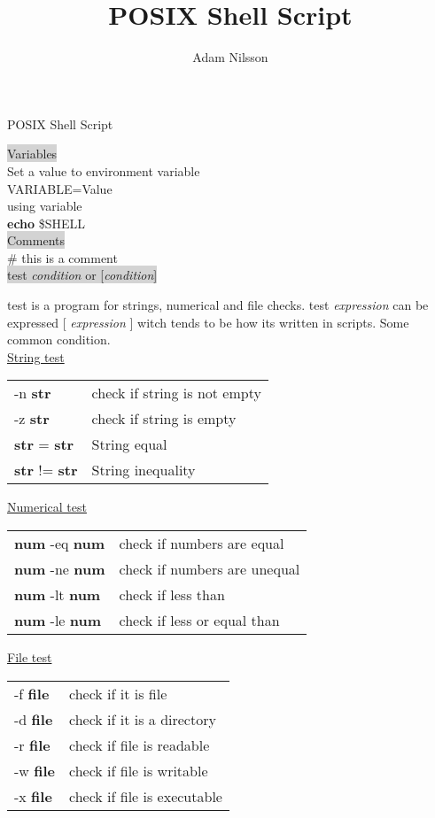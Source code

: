 \documentclass[1pt]{proc}
\title{POSIX Shell Script}
\author{Adam Nilsson}
\begin{document}
\begin{landscape}
\huge{POSIX Shell Script}
\normalsize \\
\begin{multicols}{3}
\colorbox{lightgray}{Variables}\\
Set a value to environment variable\\
VARIABLE=Value \\
using variable \\
\textbf{echo} \$SHELL \\
\colorbox{lightgray}{Comments}\\
\# this is a comment\\
\colorbox{lightgray}{test \textit{condition} or [\textit{condition}]}

test is a program for strings, numerical and file checks. test \textit{expression} can be expressed [ \textit{expression} ] witch tends to be how its written in scripts.
Some common condition.\\
\underline{String test} \\
\begin{tabular}{ l l }
	-n \textbf{str} & check if string is not empty \\
	-z \textbf{str} & check if string is empty \\
	\textbf{str} = \textbf{str} & String equal \\
	\textbf{str} != \textbf{str} & String inequality
\end{tabular}
\underline{Numerical test} \\
\begin{tabular}{ l l }
	\textbf{num} -eq \textbf{num} & check if numbers are equal \\
	\textbf{num} -ne \textbf{num} & check if numbers are unequal \\
	\textbf{num} -lt \textbf{num} & check if less than \\
	\textbf{num} -le \textbf{num} & check if less or equal than
\end{tabular}
\underline{File test} \\
\begin{tabular}{ l l }
	-f \textbf{file} & check if it is file \\
	-d \textbf{file} & check if it is a directory \\
	-r \textbf{file} & check if file is readable \\
	-w \textbf{file} & check if file is writable \\
	-x \textbf{file} & check if file is executable
\end{tabular}


\end{multicols}
\end{landscape}
\end{document}
